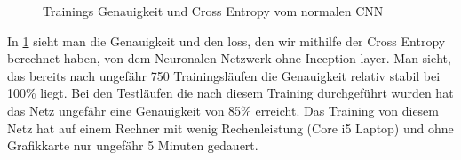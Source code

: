 \documentclass[runningheads,a4paper]{llncs}[2015/06/24]
\begin{document}
\begin{figure}
	\caption{Trainings Genauigkeit und Cross Entropy vom normalen CNN}
	\label{fig:conv_result_graph}
\end{figure}
In \cref{fig:conv_result_graph} sieht man die Genauigkeit und den loss, den wir mithilfe der Cross Entropy berechnet haben, von dem Neuronalen Netzwerk ohne Inception layer. Man sieht, das bereits nach ungefähr 750 Trainingsläufen die Genauigkeit relativ stabil bei 100\% liegt. Bei den Testläufen die nach diesem Training durchgeführt wurden hat das Netz ungefähr eine Genauigkeit von 85\% erreicht. Das Training von diesem Netz hat auf einem Rechner mit wenig Rechenleistung (Core i5 Laptop) und ohne Grafikkarte nur ungefähr 5 Minuten gedauert.\\
\end{document}
